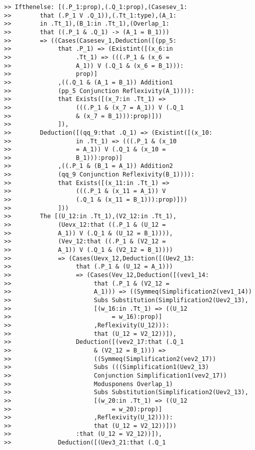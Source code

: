 \documentclass[12pt]{article}
\begin{document}
\begin{verbatim}
>> Ifthenelse: [(.P_1:prop),(.Q_1:prop),(Casesev_1:
>>        that (.P_1 V .Q_1)),(.Tt_1:type),(A_1:
>>        in .Tt_1),(B_1:in .Tt_1),(Overlap_1:
>>        that ((.P_1 & .Q_1) -> (A_1 = B_1))) 
>>        => ((Cases(Casesev_1,Deduction([(pp_5:
>>             that .P_1) => (Existint([(x_6:in 
>>                  .Tt_1) => (((.P_1 & (x_6 = 
>>                  A_1)) V (.Q_1 & (x_6 = B_1))):
>>                  prop)]
>>             ,((.Q_1 & (A_1 = B_1)) Addition1 
>>             (pp_5 Conjunction Reflexivity(A_1)))):
>>             that Exists([(x_7:in .Tt_1) => 
>>                  (((.P_1 & (x_7 = A_1)) V (.Q_1 
>>                  & (x_7 = B_1))):prop)]))
>>             ]),
>>        Deduction([(qq_9:that .Q_1) => (Existint([(x_10:
>>                  in .Tt_1) => (((.P_1 & (x_10 
>>                  = A_1)) V (.Q_1 & (x_10 = 
>>                  B_1))):prop)]
>>             ,((.P_1 & (B_1 = A_1)) Addition2 
>>             (qq_9 Conjunction Reflexivity(B_1)))):
>>             that Exists([(x_11:in .Tt_1) => 
>>                  (((.P_1 & (x_11 = A_1)) V 
>>                  (.Q_1 & (x_11 = B_1))):prop)]))
>>             ]))
>>        The [(U_12:in .Tt_1),(V2_12:in .Tt_1),
>>             (Uevx_12:that ((.P_1 & (U_12 = 
>>             A_1)) V (.Q_1 & (U_12 = B_1)))),
>>             (Vev_12:that ((.P_1 & (V2_12 = 
>>             A_1)) V (.Q_1 & (V2_12 = B_1)))) 
>>             => (Cases(Uevx_12,Deduction([(Uev2_13:
>>                  that (.P_1 & (U_12 = A_1))) 
>>                  => (Cases(Vev_12,Deduction([(vev1_14:
>>                       that (.P_1 & (V2_12 = 
>>                       A_1))) => ((Symmeq(Simplification2(vev1_14)) 
>>                       Subs Substitution(Simplification2(Uev2_13),
>>                       [(w_16:in .Tt_1) => ((U_12 
>>                            = w_16):prop)]
>>                       ,Reflexivity(U_12))):
>>                       that (U_12 = V2_12))]),
>>                  Deduction([(vev2_17:that (.Q_1 
>>                       & (V2_12 = B_1))) => 
>>                       ((Symmeq(Simplification2(vev2_17)) 
>>                       Subs (((Simplification1(Uev2_13) 
>>                       Conjunction Simplification1(vev2_17)) 
>>                       Modusponens Overlap_1) 
>>                       Subs Substitution(Simplification2(Uev2_13),
>>                       [(w_20:in .Tt_1) => ((U_12 
>>                            = w_20):prop)]
>>                       ,Reflexivity(U_12)))):
>>                       that (U_12 = V2_12))]))
>>                  :that (U_12 = V2_12))]),
>>             Deduction([(Uev3_21:that (.Q_1 

\end{verbatim}
\end{document}

